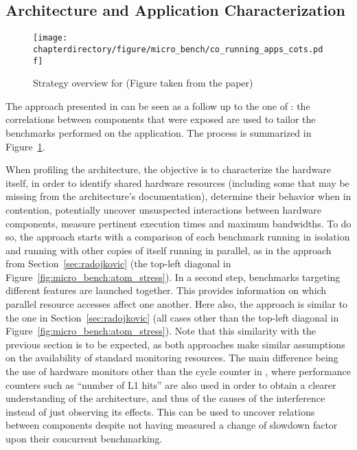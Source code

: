 \subsection{Architecture and Application Characterization}
\begin{figure}
\begin{center}
\texttt{[image: \\chapterdirectory/figure/micro\_bench/co\_running\_apps\_cots.pdf]}
\end{center}
\caption{Strategy overview for \cite{Bin14} (Figure taken from the paper)}%
\label{fig:micro_bench:co_running_apps_cots}
\end{figure}

The approach presented in \cite{Bin14} can be seen as a follow up to the one of
\cite{10.1145/2086696.2086713}: the correlations between components that were
exposed are used to tailor the benchmarks performed on the application.  The
process is summarized in Figure~\ref{fig:micro_bench:co_running_apps_cots}.

When profiling the architecture, the objective is to characterize the hardware
itself, in order to identify shared hardware resources (including some that may
be missing from the architecture's documentation), determine their behavior when
in contention, potentially uncover unsuspected interactions between hardware
components, measure pertinent execution times and maximum bandwidths. To do so, the
approach starts with a comparison of each benchmark running in isolation and
running with other copies of itself running in parallel, as in the approach from
Section~\ref{sec:radojkovic} (the top-left diagonal in
Figure~\ref{fig:micro_bench:atom_stress}). In a second step, benchmarks
targeting different features are launched together. This provides information on
which parallel resource accesses affect one another. Here also, the approach is
similar to the one in Section~\ref{sec:radojkovic} (all cases other than the
top-left diagonal in Figure~\ref{fig:micro_bench:atom_stress}). Note that this
similarity with the previous section is to be expected, as both approaches make
similar assumptions on the availability of standard monitoring resources.  The
main difference being the use of hardware monitors other than the cycle counter
in \cite{Bin14}, where performance counters such as ``number of L1 hits'' are
also used in order to obtain a clearer understanding of the architecture, and
thus of the causes of the interference instead of just observing its effects.
This can be used to uncover relations between components despite not having
measured a change of slowdown factor upon their concurrent benchmarking.

